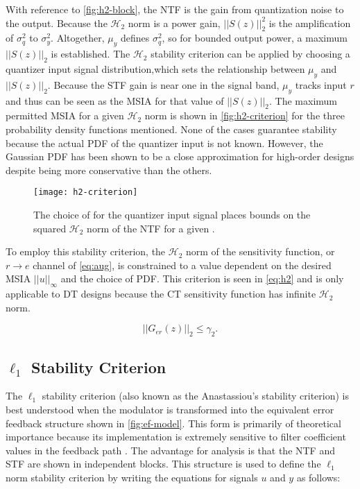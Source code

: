 With reference to \autoref{fig:h2-block}, the \gls{NTF} is the gain from quantization noise to the output. Because the $\mathcal{H}_2$ norm is a power gain, $||S(z)||_2^2$ is the amplification of $\sigma_q^2$ to $\sigma_y^2$. Altogether, $\mu_y$ defines $\sigma_q^2$, so for bounded output power, a maximum $||S(z)||_2$ is established. The $\mathcal{H}_2$ stability criterion can be applied by choosing a quantizer input signal distribution,which sets the relationship between $\mu_y$ and $||S(z)||_2$. Because the \gls{STF} gain is near one in the signal band, $\mu_y$ tracks input $r$ and thus can be seen as the \gls{MSIA} for that value of $||S(z)||_2$. The maximum permitted \gls{MSIA} for a given $\mathcal{H}_2$ norm is shown in \autoref{fig:h2-criterion} for the three probability density functions mentioned. None of the cases guarantee stability because the actual \gls{PDF} of the quantizer input is not known. However, the Gaussian \gls{PDF} has been shown to be a close approximation for high-order designs \cite{Risbo1994} despite being more conservative than the others. 

\begin{figure}
	\centering
	\texttt{[image: h2-criterion]}
	\caption{The choice of  for the quantizer input signal places bounds on the squared $\mathcal{H}_2$ norm of the \gls{NTF} for a given  \cite{Risbo1994}.} \label{fig:h2-criterion}
\end{figure}

To employ this stability criterion, the $\mathcal{H}_2$ norm of the sensitivity function, or $r \rightarrow e$ channel of \autoref{eq:aug}, is constrained to a value dependent on the desired \gls{MSIA} $||u||_\infty$ and the choice of \gls{PDF}. This criterion is seen in \autoref{eq:h2} and is only applicable to \gls{DT} designs because the \gls{CT} sensitivity function has infinite $\mathcal{H}_2$ norm.

\begin{equation}
	||G_{er}(z)||_2 \leq \gamma_2. \label{eq:h2}
\end{equation}
 
 \subsection{$\ell_1$ Stability Criterion}
 \label{sec:stab-l1}
 
The $\ell_1$ stability criterion (also known as the Anastassiou's stability criterion) is best understood when the modulator is transformed into the equivalent error feedback structure shown in \autoref{fig:ef-model}. This form is primarily of theoretical importance because its implementation is extremely sensitive to filter coefficient values in the feedback path \cite{Schreier1997}. The advantage for analysis is that the \gls{NTF} and \gls{STF} are shown in independent blocks. This structure is used to define the $\ell_1$ norm stability criterion by writing the equations for signals $u$ and $y$ as follows:
 
